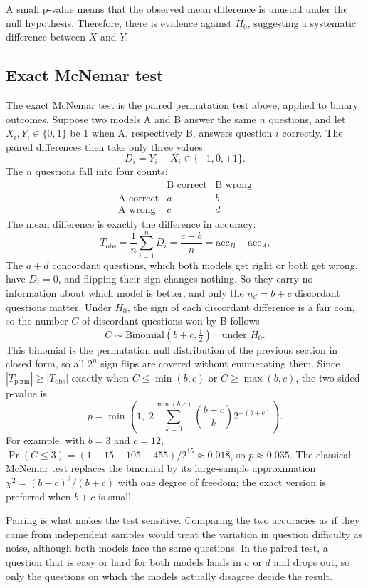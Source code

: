 A small p-value means that the observed mean difference is unusual under the null hypothesis. 
Therefore, there is evidence against \(H_0\), suggesting a systematic difference between \(X\) and \(Y\).

\subsection*{Exact McNemar test}
The exact McNemar test is the paired permutation test above, applied to binary outcomes.
Suppose two models A and B answer the same \(n\) questions, and let \(X_i, Y_i \in \{0,1\}\) be 1 when A, respectively B, answers question \(i\) correctly.
The paired differences then take only three values:
\[
D_i = Y_i - X_i \in \{-1, 0, +1\}.
\]
The \(n\) questions fall into four counts:
\[
\begin{array}{l|cc}
 & \text{B correct} & \text{B wrong} \\
\hline
\text{A correct} & a & b \\
\text{A wrong} & c & d
\end{array}
\]
The mean difference is exactly the difference in accuracy:
\[
T_{\text{obs}} = \frac{1}{n}\sum_{i=1}^n D_i = \frac{c-b}{n} = \text{acc}_B - \text{acc}_A.
\]
The \(a+d\) concordant questions, which both models get right or both get wrong, have \(D_i = 0\), and flipping their sign changes nothing.
So they carry no information about which model is better, and only the \(n_d = b + c\) discordant questions matter.
Under \(H_0\), the sign of each discordant difference is a fair coin, so the number \(C\) of discordant questions won by B follows
\[
C \sim \text{Binomial}\left(b+c, \tfrac12\right) \quad \text{under } H_0.
\]
This binomial is the permutation null distribution of the previous section in closed form, so all \(2^n\) sign flips are covered without enumerating them.
Since \(|T_{\text{perm}}| \ge |T_{\text{obs}}|\) exactly when \(C \le \min(b,c)\) or \(C \ge \max(b,c)\), the two-sided p-value is
\[
p = \min\left(1,\; 2\sum_{k=0}^{\min(b,c)} \binom{b+c}{k} 2^{-(b+c)}\right).
\]
For example, with \(b = 3\) and \(c = 12\), \(\Pr(C \le 3) = (1 + 15 + 105 + 455)/2^{15} \approx 0.018\), so \(p \approx 0.035\).
The classical McNemar test replaces the binomial by its large-sample approximation \(\chi^2 = (b-c)^2/(b+c)\) with one degree of freedom; the exact version is preferred when \(b + c\) is small.

Pairing is what makes the test sensitive.
Comparing the two accuracies as if they came from independent samples would treat the variation in question difficulty as noise, although both models face the same questions.
In the paired test, a question that is easy or hard for both models lands in \(a\) or \(d\) and drops out, so only the questions on which the models actually disagree decide the result.

